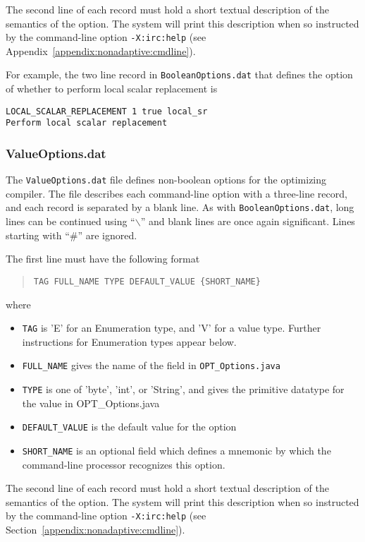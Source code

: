The second line of each record must hold a short textual description of
the semantics of the option. 
The system will print this description 
when so instructed 
by the command-line option {\tt -X:irc:help} (see Appendix~\ref{appendix:nonadaptive:cmdline}).

For example, the two line record in {\tt BooleanOptions.dat}
that defines the option of whether
to perform local scalar replacement is
\begin{verbatim}
LOCAL_SCALAR_REPLACEMENT 1 true local_sr
Perform local scalar replacement
\end{verbatim}

\subsubsection{ValueOptions.dat}

The {\tt ValueOptions.dat} file defines non-boolean options for
the optimizing compiler.  The file describes each command-line option 
with a three-line record, and each record is separated
by a blank line.  As with {\tt BooleanOptions.dat},
long lines can be continued using ``$\backslash$'' and
blank lines are once again significant.
Lines starting with ``\#'' are ignored.

The first line must have the following format
\begin{quote}
\begin{verbatim}
TAG FULL_NAME TYPE DEFAULT_VALUE {SHORT_NAME}
\end{verbatim}
\end{quote}
where
\begin{itemize}
\item {\tt TAG} is 'E' for an Enumeration type, and 'V' for a value type.  Further instructions for Enumeration types appear below.
\item {\tt FULL\_NAME} gives the name of the field in {\tt OPT\_Options.java}
\item {\tt TYPE} is one of 'byte', 'int', or 'String', and gives the primitive datatype for the value in OPT\_Options.java
\item {\tt DEFAULT\_VALUE} is the default value for the option
\item {\tt SHORT\_NAME} is an optional field which defines a mnemonic by which the command-line processor recognizes this option.
\end{itemize}

The second line of each record must hold a short textual description of
the semantics of the option.  
The system will print this description 
when so instructed 
by the command-line option {\tt -X:irc:help} (see Section~\ref{appendix:nonadaptive:cmdline}).

